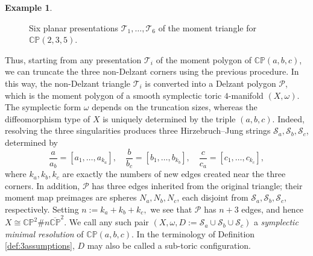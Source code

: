 \documentclass[11pt]{article}
\theoremstyle{definition}
\newtheorem{example}[theorem]{Example}
\theoremstyle{remark}
\newcommand{\CP}{\mathbb{CP}}
\newcommand{\st}{\mathcal{S}}
\begin{document}
\begin{example}
\begin{figure}[htbp]
{%
  }
  \caption{Six planar presentations $\mathcal{T}_1,\dots,\mathcal{T}_6$ of the moment triangle for $\CP(2,3,5)$.}
  \label{fig:moment-polygons-235}
\end{figure}
\end{example}

Thus, starting from any presentation $\mathcal{T}_i$ of the moment polygon of $\CP(a,b,c)$, we can truncate the three non-Delzant corners using the previous procedure. In this way, the non-Delzant triangle $\mathcal{T}_i$ is converted into a Delzant polygon $\mathcal{P}$, which is the moment polygon of a smooth symplectic toric $4$-manifold $(X,\omega)$. The symplectic form $\omega$ depends on the truncation sizes, whereas the diffeomorphism type of $X$ is uniquely determined by the triple $(a,b,c)$. Indeed, resolving the three singularities produces three Hirzebruch--Jung strings $\st_a,\st_b,\st_c$, determined by
\[
\frac{a}{a_b}=[a_1,\dots,a_{k_a}],\quad
\frac{b}{b_c}=[b_1,\dots,b_{k_b}],\quad
\frac{c}{c_a}=[c_1,\dots,c_{k_c}],
\]
where $k_a,k_b,k_c$ are exactly the numbers of new edges created near the three corners. In addition, $\mathcal{P}$ has three edges inherited from the original triangle; their moment map preimages are spheres $N_a,N_b,N_c$, each disjoint from $\st_a,\st_b,\st_c$, respectively. Setting
\(
n:=k_a+k_b+k_c,
\)
we see that $\mathcal{P}$ has $n+3$ edges, and hence
\(
X\cong \CP^2\#n\overline{\CP}^2.
\)
We call any such pair $(X,\omega,D:=\st_a\cup\st_b\cup\st_c)$ a \emph{symplectic minimal resolution} of $\CP(a,b,c)$. In the terminology of Definition \ref{def:3assumptions}, $D$ may also be called a sub-toric configuration.
\end{document}
